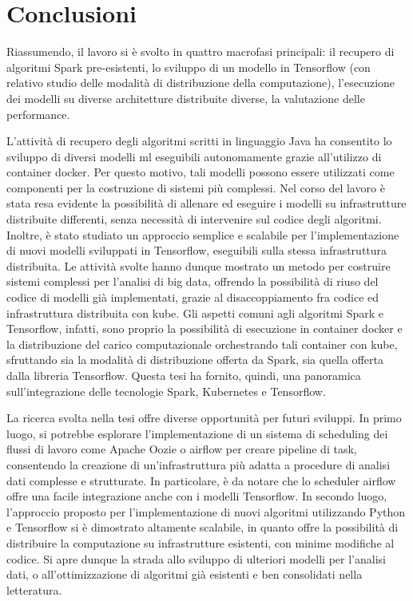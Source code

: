 \documentclass[12pt,a4paper,fleqn,titlepage]{report}
\begin{document}
\chapter{Conclusioni}\label{ch:conc}
    Riassumendo, il lavoro si è svolto in quattro macrofasi principali: il recupero di algoritmi Spark pre-esistenti, lo sviluppo di un modello in Tensorflow (con relativo studio delle modalità di distribuzione della computazione), l'esecuzione dei modelli su diverse architetture distribuite diverse, la valutazione delle performance.

    L'attività di recupero degli algoritmi scritti in linguaggio Java ha consentito lo sviluppo di diversi modelli \gls{ml} eseguibili autonomamente grazie all'utilizzo di \gls{container} \gls{docker}. Per questo motivo, tali modelli possono essere utilizzati come componenti per la costruzione di sistemi più complessi. Nel corso del lavoro è stata resa evidente la possibilità di allenare ed eseguire i modelli su infrastrutture distribuite differenti, senza necessità di intervenire sul codice degli algoritmi.
    Inoltre, è stato studiato un approccio semplice e scalabile per l'implementazione di nuovi modelli sviluppati in Tensorflow, eseguibili sulla stessa infrastruttura distribuita.
    Le attività svolte hanno dunque mostrato un metodo per costruire sistemi complessi per l'analisi di \gls{big data}, offrendo la possibilità di riuso del codice di modelli già implementati, grazie al disaccoppiamento fra codice ed infrastruttura distribuita con \gls{kube}. Gli aspetti comuni agli algoritmi Spark e Tensorflow, infatti, sono proprio la possibilità di esecuzione in \gls{container} \gls{docker} e la distribuzione del carico computazionale orchestrando tali \gls{container} con \gls{kube}, sfruttando sia la modalità di distribuzione offerta da Spark, sia quella offerta dalla libreria Tensorflow.
    Questa tesi ha fornito, quindi, una panoramica sull'integrazione delle tecnologie Spark, Kubernetes e Tensorflow.

    La ricerca svolta nella tesi offre diverse opportunità per futuri sviluppi. In primo luogo, si potrebbe esplorare l'implementazione di un sistema di scheduling dei flussi di lavoro come Apache Oozie o \gls{airflow} per creare pipeline di task, consentendo la creazione di un'infrastruttura più adatta a procedure di analisi dati complesse e strutturate. In particolare, è da notare che lo scheduler \gls{airflow} offre una facile integrazione anche con i modelli Tensorflow.
    In secondo luogo, l'approccio proposto per l'implementazione di nuovi algoritmi utilizzando Python e Tensorflow si è dimostrato altamente scalabile, in quanto offre la possibilità di distribuire la computazione su infrastrutture esistenti, con minime modifiche al codice. Si apre dunque la strada allo sviluppo di ulteriori modelli per l'analisi dati, o all'ottimizzazione di algoritmi già esistenti e ben consolidati nella letteratura.
\end{document}
